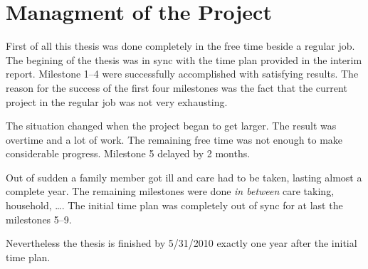 

\chapter{Managment of the Project} %
\label{cha:managment_of_the_project}
First of all this thesis was done completely in the free time beside a regular 
job.  The begining of the thesis was in sync with the time plan provided in the 
interim report. Milestone 1--4 were successfully accomplished with satisfying
results. The reason for the success of the first four milestones was the fact 
that the current project in the regular job was not very exhausting. 

The situation changed when the project began to get larger. The result was
overtime and a lot of work. The remaining free time was not enough to make
considerable progress. Milestone 5 delayed by 2 months. 

Out of sudden a family member got ill and care had to be taken, lasting almost
a complete year. The remaining milestones were done \emph{in between} care taking,
household, \ldots. The initial time plan was completely out of sync for at last
the milestones 5--9. 

Nevertheless the thesis is finished by 5/31/2010 exactly one year after the
initial time plan. 

